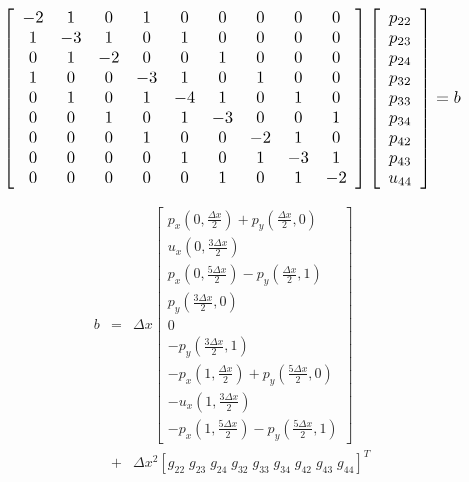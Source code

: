 \documentclass[journal]{IEEEtran}
\begin{document}
\begin{equation}
\resizebox{.95\hsize}{!}{$
\left[\begin{array}{ccccccccc}
-2 & 1 & 0 & 1 & 0 & 0 & 0 & 0 & 0\\
1 & -3 & 1 & 0 & 1 & 0 & 0 & 0 & 0\\
0 & 1 & -2 & 0 & 0 & 1 & 0 & 0 & 0\\
1 & 0 & 0 & -3 & 1 & 0 & 1 & 0 & 0\\
0 & 1 & 0 & 1 & -4 & 1 & 0 & 1 & 0\\
0 & 0 & 1 & 0 & 1 & -3 & 0 & 0 & 1\\
0 & 0 & 0 & 1 & 0 & 0 & -2 & 1 & 0\\
0 & 0 & 0 & 0 & 1 & 0 & 1 & -3 & 1\\
0 & 0 & 0 & 0 & 0 & 1 & 0 & 1 & -2 
\end{array}\right] \left[\begin{array}{c}
p_{22}\\ p_{23}\\ p_{24}	\\ p_{32}\\ p_{33}\\ p_{34}\\ p_{42}\\p_{43} \\u_{44}
\end{array}\right] = b$} \label{matrixAnulleigen}
\end{equation}

\begin{eqnarray}
b & = & \Delta x\left[\begin{array}{c}
p_x\left(0, \frac{\Delta x}{2}\right) + p_y\left(\frac{\Delta x}{2},0\right)\\
u_x\left(0, \frac{3\Delta x}{2}\right)\\
p_x\left(0, \frac{5\Delta x}{2}\right) - p_y\left(\frac{\Delta x}{2},1\right)\\
p_y\left(\frac{3\Delta x}{2},0\right)\\
0 \\
-p_y\left(\frac{3\Delta x}{2},1\right)\\
-p_x\left(1, \frac{\Delta x}{2}\right) + p_y\left(\frac{5\Delta x}{2},0\right)\\
-u_x\left(1, \frac{3\Delta x}{2}\right)\\
-p_x\left(1, \frac{5\Delta x}{2}\right) - p_y\left(\frac{5\Delta x}{2}, 1\right)
\end{array}\right] \nonumber\\
&+& \Delta x^2 \left[
g_{22}\; g_{23}\; g_{24}\; g_{32}\; g_{33}\; g_{34}\; g_{42}\; g_{43} \; g_{44}
\right]^T \label{bPartnulleigen}
\end{eqnarray}
\end{document}
